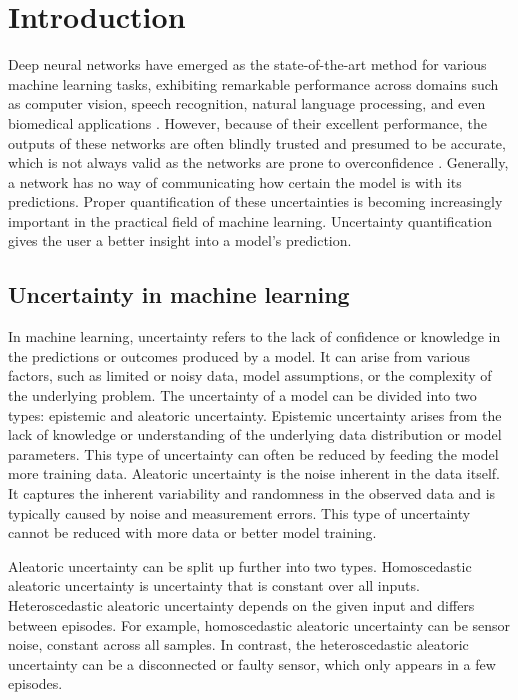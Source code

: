 \section{Introduction}\label{sec:introduction}

Deep neural networks have emerged as the state-of-the-art method for various machine learning tasks, exhibiting remarkable performance across domains such as computer vision, speech recognition, natural language processing, and even biomedical applications \citep{yoo2015deep, zheng2015investigating}. However, because of their excellent performance, the outputs of these networks are often blindly trusted and presumed to be accurate, which is not always valid as the networks are prone to overconfidence \citep{thulasidasan2019mixup}. Generally, a network has no way of communicating how certain the model is with its predictions. Proper quantification of these uncertainties is becoming increasingly important in the practical field of machine learning. Uncertainty quantification gives the user a better insight into a model's prediction.

\subsection{Uncertainty in machine learning}

In machine learning, uncertainty refers to the lack of confidence or knowledge in the predictions or outcomes produced by a model. It can arise from various factors, such as limited or noisy data, model assumptions, or the complexity of the underlying problem. The uncertainty of a model can be divided into two types: epistemic and aleatoric uncertainty. Epistemic uncertainty arises from the lack of knowledge or understanding of the underlying data distribution or model parameters. This type of uncertainty can often be reduced by feeding the model more training data. Aleatoric uncertainty is the noise inherent in the data itself. It captures the inherent variability and randomness in the observed data and is typically caused by noise and measurement errors. This type of uncertainty cannot be reduced with more data or better model training.

Aleatoric uncertainty can be split up further into two types. Homoscedastic aleatoric uncertainty is uncertainty that is constant over all inputs. Heteroscedastic aleatoric uncertainty depends on the given input and differs between episodes. For example, homoscedastic aleatoric uncertainty can be sensor noise, constant across all samples. In contrast, the heteroscedastic aleatoric uncertainty can be a disconnected or faulty sensor, which only appears in a few episodes.

